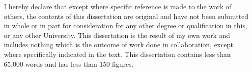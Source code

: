 
\begin{declaration}

I hereby declare that except where specific reference is made to the work of others, the contents of this dissertation are original and have not been submitted in whole or in part for consideration for any other degree or qualification in this, or any other University. This dissertation is the result of my own work and includes nothing which is the outcome of work done in collaboration, except where specifically indicated in the text. This dissertation contains less than 65,000 words 
and has less than 150 figures.


\end{declaration}

